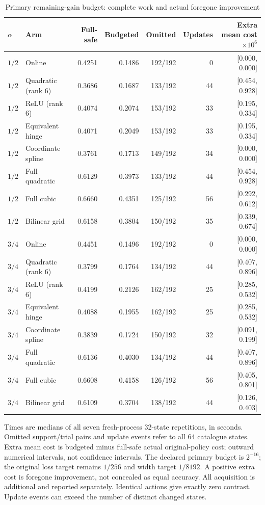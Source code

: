\begin{table}[htbp]\caption{Primary remaining-gain budget: complete work and actual foregone improvement}\label{tab:budget110}
\centering\scriptsize
\begin{tabular}{@{}llrrrrr@{}}\toprule
$\alpha$ & Arm & Full-safe & Budgeted & Omitted & Updates & Extra mean cost $\times10^6$\\\midrule
$1/2$ & Online & 0.4251 & 0.1486 & 192/192 & 0 & [0.000, 0.000]\\
$1/2$ & Quadratic (rank 6) & 0.3686 & 0.1687 & 133/192 & 44 & [0.454, 0.928]\\
$1/2$ & ReLU (rank 6) & 0.4074 & 0.2074 & 153/192 & 33 & [0.195, 0.334]\\
$1/2$ & Equivalent hinge & 0.4071 & 0.2049 & 153/192 & 33 & [0.195, 0.334]\\
$1/2$ & Coordinate spline & 0.3761 & 0.1713 & 149/192 & 34 & [0.000, 0.000]\\
$1/2$ & Full quadratic & 0.6129 & 0.3973 & 133/192 & 44 & [0.454, 0.928]\\
$1/2$ & Full cubic & 0.6660 & 0.4351 & 125/192 & 56 & [0.292, 0.612]\\
$1/2$ & Bilinear grid & 0.6158 & 0.3804 & 150/192 & 35 & [0.339, 0.674]\\
$3/4$ & Online & 0.4451 & 0.1496 & 192/192 & 0 & [0.000, 0.000]\\
$3/4$ & Quadratic (rank 6) & 0.3799 & 0.1764 & 134/192 & 44 & [0.407, 0.896]\\
$3/4$ & ReLU (rank 6) & 0.4199 & 0.2126 & 162/192 & 25 & [0.285, 0.532]\\
$3/4$ & Equivalent hinge & 0.4088 & 0.1955 & 162/192 & 25 & [0.285, 0.532]\\
$3/4$ & Coordinate spline & 0.3839 & 0.1724 & 150/192 & 32 & [0.091, 0.199]\\
$3/4$ & Full quadratic & 0.6136 & 0.4030 & 134/192 & 44 & [0.407, 0.896]\\
$3/4$ & Full cubic & 0.6608 & 0.4158 & 126/192 & 56 & [0.405, 0.801]\\
$3/4$ & Bilinear grid & 0.6109 & 0.3704 & 138/192 & 44 & [0.126, 0.403]\\
\bottomrule\end{tabular}
\par\smallskip\begin{minipage}{.98\linewidth}\footnotesize
Times are medians of all seven fresh-process 32-state repetitions, in seconds. Omitted support/trial pairs and update events refer to all 64 catalogue states. Extra mean cost is budgeted minus full-safe actual original-policy cost; outward numerical intervals, not confidence intervals. The declared primary budget is $2^{-16}$; the original loss target remains $1/256$ and width target $1/8192$. A positive extra cost is foregone improvement, not concealed as equal accuracy. All acquisition is additional and reported separately. Identical actions give exactly zero contrast. Update events can exceed the number of distinct changed states.
\end{minipage}\end{table}
